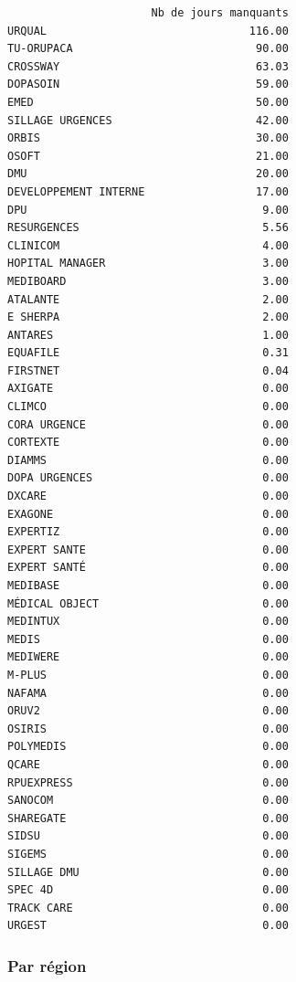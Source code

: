\documentclass[]{article}
\begin{document}
\begin{verbatim}
                      Nb de jours manquants
URQUAL                               116.00
TU-ORUPACA                            90.00
CROSSWAY                              63.03
DOPASOIN                              59.00
EMED                                  50.00
SILLAGE URGENCES                      42.00
ORBIS                                 30.00
OSOFT                                 21.00
DMU                                   20.00
DEVELOPPEMENT INTERNE                 17.00
DPU                                    9.00
RESURGENCES                            5.56
CLINICOM                               4.00
HOPITAL MANAGER                        3.00
MEDIBOARD                              3.00
ATALANTE                               2.00
E SHERPA                               2.00
ANTARES                                1.00
EQUAFILE                               0.31
FIRSTNET                               0.04
AXIGATE                                0.00
CLIMCO                                 0.00
CORA URGENCE                           0.00
CORTEXTE                               0.00
DIAMMS                                 0.00
DOPA URGENCES                          0.00
DXCARE                                 0.00
EXAGONE                                0.00
EXPERTIZ                               0.00
EXPERT SANTE                           0.00
EXPERT SANTÉ                           0.00
MEDIBASE                               0.00
MÉDICAL OBJECT                         0.00
MEDINTUX                               0.00
MEDIS                                  0.00
MEDIWERE                               0.00
M-PLUS                                 0.00
NAFAMA                                 0.00
ORUV2                                  0.00
OSIRIS                                 0.00
POLYMEDIS                              0.00
QCARE                                  0.00
RPUEXPRESS                             0.00
SANOCOM                                0.00
SHAREGATE                              0.00
SIDSU                                  0.00
SIGEMS                                 0.00
SILLAGE DMU                            0.00
SPEC 4D                                0.00
TRACK CARE                             0.00
URGEST                                 0.00
\end{verbatim}

\subsubsection{Par région}\label{par-region}
\end{document}
